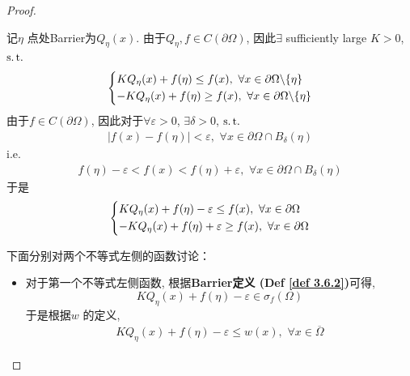 \begin{thm}
\begin{proof}
\begin{enumerate}
				记$\eta$ 点处Barrier为$Q_\eta(x)$. 由于$Q_\eta , f \in C(\partial \Omega)$, 因此$\exists$ sufficiently large $K > 0$, $\operatorname{s.t.}$
				\begin{align*}
					\begin{dcases*}
						K Q_\eta(x) + f(\eta) \leq f(x) , \,\, \forall x \in \partial \Omega \backslash \{ \eta \} \\
						-K Q_{\eta}(x) + f(\eta) \geq f(x) , \,\, \forall x \in \partial \Omega \backslash \{ \eta \}
					\end{dcases*}
				\end{align*}
				由于$f \in C(\partial \Omega)$, 因此对于$\forall \varepsilon > 0$, $\exists \delta > 0$, $\operatorname{s.t.}$
				\begin{align*}
					| f(x) - f(\eta) | < \varepsilon , \,\, \forall x \in \partial \Omega \cap B_{\delta}(\eta)
				\end{align*}
				i.e.
				\begin{align*}
					f(\eta) - \varepsilon < f(x) < f(\eta) + \varepsilon , \,\, \forall x \in \partial \Omega \cap B_{\delta}(\eta)
				\end{align*}
				于是
				\begin{align*}
					\begin{dcases*}
						K Q_\eta(x) + f(\eta) - \varepsilon \leq f(x) , \,\, \forall x \in \partial \Omega \\
						-K Q_{\eta}(x) + f(\eta) + \varepsilon \geq f(x) , \,\, \forall x \in \partial \Omega 
					\end{dcases*}
				\end{align*}
				
				\vspace*{2em}
				
				下面分别对两个不等式左侧的函数讨论：
				
				\vspace*{1em}
			
				\begin{itemize}
					\item 对于第一个不等式左侧函数, 根据\textbf{Barrier定义 (Def \ref{def 3.6.2})}可得, 
					\[ K Q_\eta(x) + f(\eta) - \varepsilon \in \sigma_{f}(\Omega) \]
					于是根据$w$ 的定义, 
					\begin{align*}
						K Q_\eta(x) + f(\eta) - \varepsilon \leq w(x) , \,\, \forall x \in \overline{\Omega}
					\end{align*}
				
					\vspace*{2em}
					

\end{itemize}
\end{enumerate}
\end{proof}
\end{thm}
